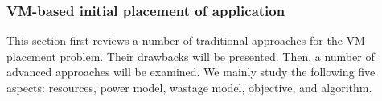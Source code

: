 

\subsubsection{VM-based initial placement of application}
\label{initial_placement}
This section first reviews a number of traditional approaches for the VM placement problem. Their drawbacks will be presented. Then, a number of advanced approaches will be examined. We mainly study the following five aspects: resources, power model, wastage model, objective, and algorithm.

